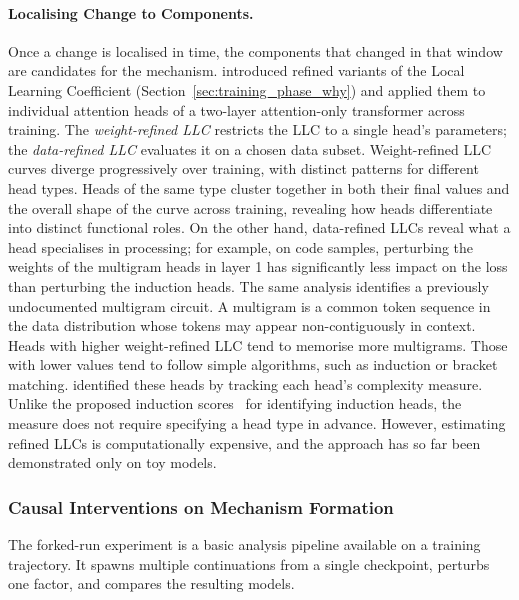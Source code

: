 \paragraph{Localising Change to Components.} Once a change is localised in time, the components that changed in that window are candidates for the mechanism.  introduced refined variants of the Local Learning Coefficient (Section~\ref{sec:training_phase_why}) and applied them to individual attention heads of a two-layer attention-only transformer across training. The \emph{weight-refined LLC} restricts the LLC to a single head's parameters; the \emph{data-refined LLC} evaluates it on a chosen data subset. Weight-refined LLC curves diverge progressively over training, with distinct patterns for different head types. Heads of the same type cluster together in both their final values and the overall shape of the curve across training, revealing how heads differentiate into distinct functional roles. On the other hand, data-refined LLCs reveal what a head specialises in processing; for example, on code samples, perturbing the weights of the multigram heads in layer 1 has significantly less impact on the loss than perturbing the induction heads. The same analysis identifies a previously undocumented multigram circuit. A multigram is a common token sequence in the data distribution whose tokens may appear non-contiguously in context. Heads with higher weight-refined LLC tend to memorise more multigrams. Those with lower values tend to follow simple algorithms, such as induction or bracket matching.  identified these heads by tracking each head’s complexity measure. Unlike the proposed induction scores~ for identifying induction heads, the measure does not require specifying a head type in advance. However, estimating refined LLCs is computationally expensive, and the approach has so far been demonstrated only on toy models.

\subsubsection{Causal Interventions on Mechanism Formation}
\label{sec:ld-causal-interventions}

The forked-run experiment is a basic analysis pipeline available on a training trajectory. It spawns multiple continuations from a single checkpoint, perturbs one factor, and compares the resulting models.

